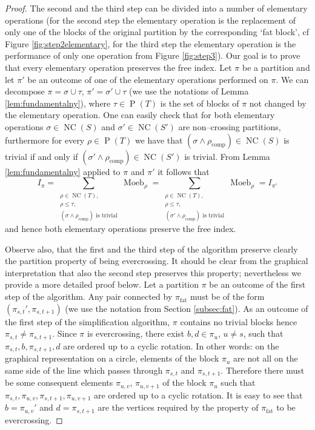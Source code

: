\documentclass[12pt,dvips]{amsart}
\numberwithin{equation}{section} \numberwithin{figure}{section}
\theoremstyle{plain}
\theoremstyle{definition}
\theoremstyle{remark}
\DeclareMathOperator{\comp}{comp}
\DeclareMathOperator{\fat}{fat}
\DeclareMathOperator{\PP}{P}
\DeclareMathOperator{\NC}{NC}
\DeclareMathOperator{\Moeb}{Moeb}
\begin{document}
\begin{proof}
The second and the third step can be divided into a number of
elementary operations
(for the second step the elementary operation is the replacement of
only one of the blocks of the original partition by the
corresponding `fat block', cf Figure \ref{fig:step2elementary}, for
the third step the elementary operation is the performance of only
one operation from Figure \ref{fig:step3}). Our goal is to prove
that every elementary operation preserves the free index. Let $\pi$
be a partition and let $\pi'$ be an outcome of one of the elementary
operations performed on $\pi$. We can decompose $\pi=\sigma \cup
\tau$, $\pi'=\sigma'\cup\tau$ (we use the notations of Lemma
\ref{lem:fundamentalny}), where $\tau\in\PP(T)$ is the set of blocks
of $\pi$ not changed by the elementary operation. One can easily
check that for both elementary operations $\sigma\in\NC(S)$ and
$\sigma'\in\NC(S')$ are non--crossing partitions, furthermore for
every $\rho\in\PP(T)$ we have that $(\sigma \wedge
\rho_{\comp})\in\NC(S)$ is trivial if and only if $(\sigma' \wedge
\rho_{\comp})\in\NC(S')$ is trivial. From Lemma
\ref{lem:fundamentalny} applied to $\pi$ and $\pi'$ it follows that
$$ I_{\pi}=\sum_{\substack{\rho\in\NC(T), \\ \rho\leq \tau,
\\ (\sigma \wedge \rho_{\comp}) \text{ is trivial}  }}
  \Moeb_{\rho}=
\sum_{\substack{\rho\in\NC(T), \\ \rho\leq \tau,
\\ (\sigma' \wedge \rho_{\comp}) \text{ is trivial}  }}
  \Moeb_{\rho}= I_{\pi'}$$
and hence both elementary operations preserve the free index.

Observe also, that the first and the third step of the algorithm
preserve clearly the partition property of being evercrossing. It
should be clear from the graphical interpretation that also the
second step preserves this property; nevertheless we provide a more
detailed proof below. Let a partition $\pi$ be an outcome of the
first step of the algorithm. Any pair connected by $\pi_{\fat}$ must
be of the form $(\pi_{s,t}', \pi_{s,t+1})$ (we use the notation from
Section \ref{subsec:fat}). As an outcome of the first step of the
simplification algorithm, $\pi$ contains no trivial blocks hence
$\pi_{s,t}\neq \pi_{s,t+1}$. Since $\pi$ is evercrossing, there
exist $b,d\in\pi_{u}$, $u\neq s$, such that
$\pi_{s,t},b,\pi_{s,t+1},d$ are ordered up to a cyclic rotation. In
other words: on the graphical representation on a circle, elements
of the block $\pi_u$ are not all on the same side of the line which
passes through $\pi_{s,t}$ and $\pi_{s,t+1}$. Therefore there must
be some consequent elements $\pi_{u,v}$, $\pi_{u,v+1}$ of the block
$\pi_u$ such that $\pi_{s,t},\pi_{u,v},\pi_{s,t+1},\pi_{u,v+1}$ are
ordered up to a cyclic rotation. It is easy to see that
$b=\pi_{u,v}'$ and $d=\pi_{s,t+1}$ are the vertices required by the
property of $\pi_{\fat}$ to be evercrossing.


\end{proof}
\end{document}
